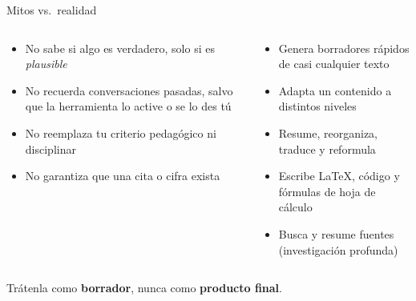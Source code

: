 \documentclass[aspectratio=169,10pt]{beamer}
\begin{document}
\begin{frame}{Mitos vs.\ realidad}
\begin{columns}[T]
\begin{tcolorbox}[enhanced,colback=Al!6,colframe=Al,arc=2mm,
  title={\faTimesCircle\ NO hace esto},fonttitle=\bfseries\color{white},colbacktitle=Al]
\begin{itemize}\small
  \item No sabe si algo es verdadero, solo si es \emph{plausible}
  \item No recuerda conversaciones pasadas, salvo que la herramienta lo active o se lo des tú
  \item No reemplaza tu criterio pedagógico ni disciplinar
  \item No garantiza que una cita o cifra exista
\end{itemize}
\end{tcolorbox}
\begin{tcolorbox}[enhanced,colback=Ac2!6,colframe=Ac2,arc=2mm,
  title={\faCheckCircle\ SÍ hace esto},fonttitle=\bfseries\color{white},colbacktitle=Ac2]
\begin{itemize}\small
  \item Genera borradores rápidos de casi cualquier texto
  \item Adapta un contenido a distintos niveles
  \item Resume, reorganiza, traduce y reformula
  \item Escribe \LaTeX, código y fórmulas de hoja de cálculo
  \item Busca y resume fuentes (investigación profunda)
\end{itemize}
\end{tcolorbox}
\end{columns}
\vspace{8pt}
\begin{center}
\large\color{Dp}Trátenla como \textbf{borrador}, nunca como \textbf{producto final}.
\end{center}
\end{frame}
\end{document}
